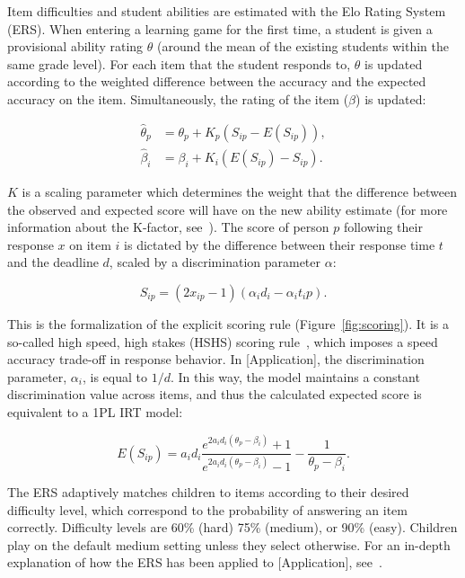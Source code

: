 \documentclass[anonymous,manuscript,review]{acmart}
\begin{document}
Item difficulties and student abilities are estimated with the Elo Rating System (ERS). %
When entering a learning game for the first time, a student is given a provisional ability rating $\theta$ (around the mean of the existing students within the same grade level). For each item that the student responds to, $\theta$ is updated according to the weighted difference between the accuracy and the expected accuracy on the item. Simultaneously, the rating of the item ($\beta$) is updated: 

\begin{align}
    \hat{\theta}_p &= \theta_p + K_p(S_{ip} - E(S_{ip})), \\
    \hat{\beta}_i &= \beta_i + K_i(E(S_{ip}) - S_{ip}).
\end{align}

\noindent $K$ is a scaling parameter which determines the weight that the difference between the observed and expected score will have on the new ability estimate (for more information about the K-factor, see~\cite{vermeiren2024balancing}). The score of person $p$ following their response $x$ on item $i$ is dictated by the difference between their response time $t$ and the deadline $d$, scaled by a discrimination parameter $\alpha$:

\begin{equation}
    S_{ip} = (2x_{ip} - 1)(\alpha_id_i - \alpha_it_ip).
    \label{eq:scoring}
\end{equation}

\noindent This is the formalization of the explicit scoring rule (Figure~\ref{fig:scoring}). It is a so-called high speed, high stakes (HSHS) scoring rule~\cite{maris2012speed}, which imposes a speed accuracy trade-off in response behavior. In [Application], the discrimination parameter, $\alpha_i$, is equal to $1/d$. In this way, the model maintains a constant discrimination value across items, and thus the calculated expected score is equivalent to a 1PL IRT model: 

\begin{equation}
    E(S_{ip}) = a_i d_i \frac{e^{2 a_i d_i (\theta_p - \beta_i)} + 1}{e^{2 a_i d_i (\theta_p - \beta_i)} - 1} - \frac{1}{\theta_p - \beta_i}.
\end{equation}

\noindent The ERS adaptively matches children to items according to their desired difficulty level, which correspond to the probability of answering an item correctly. Difficulty levels are 60\% (hard) 75\% (medium), or 90\% (easy). Children play on the default medium setting unless they select otherwise. For an in-depth explanation of how the ERS has been applied to [Application], see~\cite{klinkenberg2011computer}.
\end{document}
